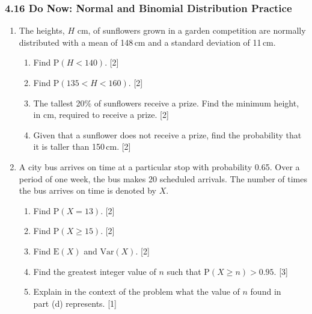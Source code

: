 \documentclass[12pt, twoside]{article}
\begin{document}
\subsubsection*{4.16 Do Now: Normal and Binomial Distribution Practice}
\begin{enumerate}[itemsep=0.1cm]

\item The heights, $H$ cm, of sunflowers grown in a garden competition are normally distributed
with a mean of 148\,cm and a standard deviation of 11\,cm.

\begin{enumerate}[itemsep=0.25cm]
    \item Find $\mathrm{P}(H < 140)$. \hfill [2]
    \item Find $\mathrm{P}(135 < H < 160)$. \hfill [2]
    \item The tallest 20\% of sunflowers receive a prize. Find the minimum height, in cm,
    required to receive a prize. \hfill [2]
    \item Given that a sunflower does not receive a prize, find the probability that it is
    taller than 150\,cm. \hfill [2]
\end{enumerate}


\newpage

\item A city bus arrives on time at a particular stop with probability 0.65. Over a period
of one week, the bus makes 20 scheduled arrivals. The number of times the bus arrives
on time is denoted by $X$.

\begin{enumerate}[itemsep=0.25cm]
    \item Find $\mathrm{P}(X = 13)$. \hfill [2]
    \item Find $\mathrm{P}(X \geq 15)$. \hfill [2]
    \item Find $\mathrm{E}(X)$ and $\mathrm{Var}(X)$. \hfill [2]
    \item Find the greatest integer value of $n$ such that $\mathrm{P}(X \geq n) > 0.95$. \hfill [3]
    \item Explain in the context of the problem what the value of $n$ found in \\
    part (d) represents. \hfill [1]
\end{enumerate}


\end{enumerate}
\end{document}
